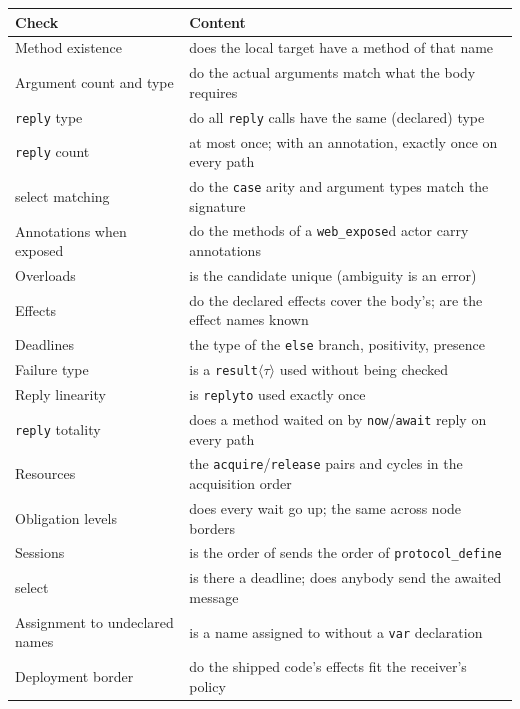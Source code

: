 \documentclass[11pt,a4paper]{article}
\begin{document}
\begin{center}
\small
\begin{tabular}{@{}lp{9.0cm}@{}}
\toprule
Check & Content \\
\midrule
Method existence   & does the local target have a method of that name \\
Argument count and type & do the actual arguments match what the body requires \\
\texttt{reply} type & do all \texttt{reply} calls have the same (declared) type \\
\texttt{reply} count & at most once; with an annotation, exactly once on every path \\
select matching    & do the \texttt{case} arity and argument types match the signature \\
Annotations when exposed & do the methods of a \texttt{web\_expose}d actor carry annotations \\
Overloads          & is the candidate unique (ambiguity is an error) \\
Effects            & do the declared effects cover the body's; are the effect names known \\
Deadlines          & the type of the \texttt{else} branch, positivity, presence \\
Failure type       & is a \texttt{result}$\langle\tau\rangle$ used without being checked \\
Reply linearity    & is \texttt{replyto} used exactly once \\
\texttt{reply} totality & does a method waited on by \texttt{now}/\texttt{await} reply on every path \\
Resources          & the \texttt{acquire}/\texttt{release} pairs and cycles in the acquisition order \\
Obligation levels  & does every wait go up; the same across node borders \\
Sessions           & is the order of sends the order of \texttt{protocol\_define} \\
select             & is there a deadline; does anybody send the awaited message \\
Assignment to undeclared names & is a name assigned to without a \texttt{var} declaration \\
Deployment border  & do the shipped code's effects fit the receiver's policy \\
\bottomrule
\end{tabular}
\end{center}
\end{document}

